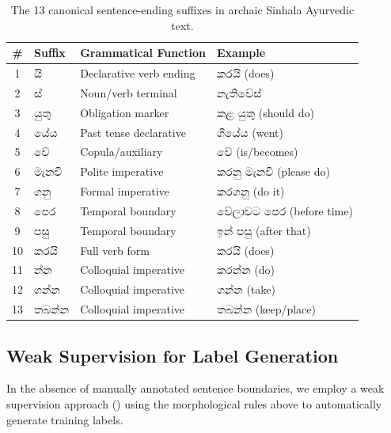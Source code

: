 \documentclass[12pt, a4paper, twoside]{report}
\begin{document}
\begin{table}[htbp]
\centering
\caption{The 13 canonical sentence-ending suffixes in archaic Sinhala Ayurvedic text.}
\label{tab:suffixes}
\begin{tabular}{clll}
\toprule
\textbf{\#} & \textbf{Suffix} & \textbf{Grammatical Function} & \textbf{Example} \\
\midrule
1 & යි & Declarative verb ending & කරයි (does) \\
2 & ස් & Noun/verb terminal & නැතිවේස් \\
3 & යුතු & Obligation marker & කළ යුතු (should do) \\
4 & යේය & Past tense declarative & ගියේය (went) \\
5 & වේ & Copula/auxiliary & වේ (is/becomes) \\
6 & මැනවි & Polite imperative & කරනු මැනවි (please do) \\
7 & ගනු & Formal imperative & කරගනු (do it) \\
8 & පෙර & Temporal boundary & වේලාවට පෙර (before time) \\
9 & පසු & Temporal boundary & ඉන් පසු (after that) \\
10 & කරයි & Full verb form & කරයි (does) \\
11 & න්න & Colloquial imperative & කරන්න (do) \\
12 & ගන්න & Colloquial imperative & ගන්න (take) \\
13 & තබන්න & Colloquial imperative & තබන්න (keep/place) \\
\bottomrule
\end{tabular}
\end{table}

\subsection{Weak Supervision for Label Generation}
\label{sec:weak-supervision}

In the absence of manually annotated sentence boundaries, we employ a weak supervision approach () using the morphological rules above to automatically generate training labels.
\end{document}
